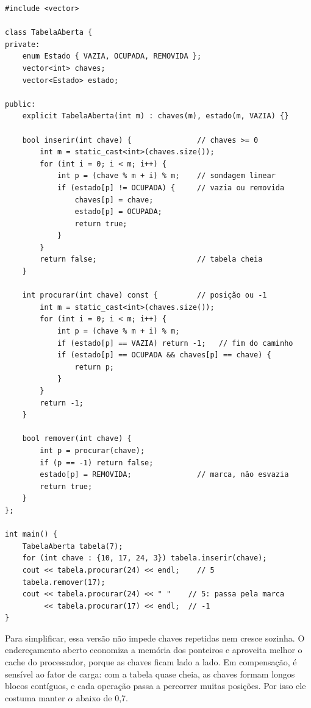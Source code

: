 \begin{codigo}
\begin{Verbatim}[breaklines=true, breaksymbolleft={}, fontsize=\footnotesize]
#include <vector>

class TabelaAberta {
private:
    enum Estado { VAZIA, OCUPADA, REMOVIDA };
    vector<int> chaves;
    vector<Estado> estado;

public:
    explicit TabelaAberta(int m) : chaves(m), estado(m, VAZIA) {}

    bool inserir(int chave) {               // chaves >= 0
        int m = static_cast<int>(chaves.size());
        for (int i = 0; i < m; i++) {
            int p = (chave % m + i) % m;    // sondagem linear
            if (estado[p] != OCUPADA) {     // vazia ou removida
                chaves[p] = chave;
                estado[p] = OCUPADA;
                return true;
            }
        }
        return false;                       // tabela cheia
    }

    int procurar(int chave) const {         // posição ou -1
        int m = static_cast<int>(chaves.size());
        for (int i = 0; i < m; i++) {
            int p = (chave % m + i) % m;
            if (estado[p] == VAZIA) return -1;   // fim do caminho
            if (estado[p] == OCUPADA && chaves[p] == chave) {
                return p;
            }
        }
        return -1;
    }

    bool remover(int chave) {
        int p = procurar(chave);
        if (p == -1) return false;
        estado[p] = REMOVIDA;               // marca, não esvazia
        return true;
    }
};

int main() {
    TabelaAberta tabela(7);
    for (int chave : {10, 17, 24, 3}) tabela.inserir(chave);
    cout << tabela.procurar(24) << endl;    // 5
    tabela.remover(17);
    cout << tabela.procurar(24) << " "    // 5: passa pela marca
         << tabela.procurar(17) << endl;  // -1
}
\end{Verbatim}
\end{codigo}

Para simplificar, essa versão não impede chaves repetidas nem cresce sozinha. O endereçamento aberto economiza a memória dos ponteiros e aproveita melhor o cache do processador, porque as chaves ficam lado a lado. Em compensação, é sensível ao fator de carga: com a tabela quase cheia, as chaves formam longos blocos contíguos, e cada operação passa a percorrer muitas posições. Por isso ele costuma manter $\alpha$ abaixo de 0,7.


